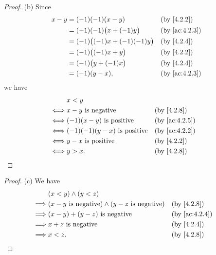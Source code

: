 \begin{proof}{(b)}
  Since
  \begin{align*}
    x - y & = (-1)(-1)(x - y)                 &  & \by{4.2.2}                  \\
          & = (-1)(-1)\big(x + (-1)y\big)     &  & \text{(by \cref{ac:4.2.3})} \\
          & = (-1)\big((-1)x + (-1)(-1)y\big) &  & \by{4.2.4}                  \\
          & = (-1)\big((-1)x + y\big)         &  & \by{4.2.2}                  \\
          & = (-1)\big(y + (-1)x\big)         &  & \by{4.2.4}                  \\
          & = (-1)(y - x),                    &  & \text{(by \cref{ac:4.2.3})}
  \end{align*}
  we have
  \begin{align*}
         & x < y                                                                \\
    \iff & x - y \text{ is negative}           &  & \by{4.2.8}                  \\
    \iff & (-1)(x - y) \text{ is positive}     &  & \text{(by \cref{ac:4.2.5})} \\
    \iff & (-1)(-1)(y - x) \text{ is positive} &  & \text{(by \cref{ac:4.2.2})} \\
    \iff & y - x \text{ is positive}           &  & \by{4.2.2}                  \\
    \iff & y > x.                              &  & \by{4.2.8}
  \end{align*}
\end{proof}

\begin{proof}{(c)}
  We have
  \begin{align*}
             & (x < y) \land (y < z)                                                                          \\
    \implies & (x - y \text{ is negative}) \land (y - z \text{ is negative}) &  & \by{4.2.8}                  \\
    \implies & (x - y) + (y - z) \text{ is negative}                         &  & \text{(by \cref{ac:4.2.4})} \\
    \implies & x + z \text{ is negative}                                     &  & \by{4.2.4}                  \\
    \implies & x < z.                                                        &  & \by{4.2.8}
  \end{align*}
\end{proof}


